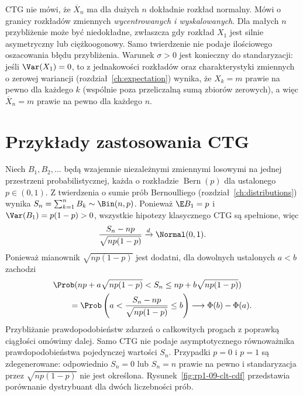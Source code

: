\begin{uwaga}
CTG nie mówi, że $\overline X_n$ ma dla dużych $n$
dokładnie rozkład normalny. Mówi o granicy rozkładów
zmiennych \emph{wycentrowanych i wyskalowanych}.
Dla małych $n$ przybliżenie może być niedokładne,
zwłaszcza gdy rozkład $X_1$ jest silnie asymetryczny
lub ciężkoogonowy. Samo twierdzenie nie podaje
ilościowego oszacowania błędu przybliżenia.
Warunek $\sigma>0$ jest konieczny do standaryzacji:
jeśli $\Var(X_1)=0$, to z jednakowości rozkładów
oraz charakterystyki zmiennych o zerowej wariancji
(rozdział~\ref{ch:expectation}) wynika, że $X_k=m$
prawie na pewno dla każdego $k$ (wspólnie poza przeliczalną sumą
zbiorów zerowych), a więc $\overline X_n=m$
prawie na pewno dla każdego $n$.
\end{uwaga}

\section{Przykłady zastosowania CTG}

\begin{przyklad}
Niech $B_1,B_2,\ldots$ będą wzajemnie niezależnymi
zmiennymi losowymi na jednej przestrzeni probabilistycznej,
każda o rozkładzie $\operatorname{Bern}(p)$ dla ustalonego
$p\in(0,1)$. Z twierdzenia o sumie prób Bernoulliego
(rozdział~\ref{ch:distributions}) wynika
$S_n=\sum_{k=1}^nB_k\sim\Bin(n,p)$.
Ponieważ $\E B_1=p$ i $\Var(B_1)=p(1-p)>0$,
wszystkie hipotezy klasycznego CTG są spełnione, więc
\[
\frac{S_n-np}{\sqrt{np(1-p)}}\xrightarrow d\Normal(0,1).
\]
Ponieważ mianownik $\sqrt{np(1-p)}$ jest dodatni,
dla dowolnych ustalonych $a<b$ zachodzi
\[
\begin{aligned}
&\Prob(np+a\sqrt{np(1-p)}<S_n\leq np+b\sqrt{np(1-p)})\\
&\qquad=\Prob\left(a<\frac{S_n-np}{\sqrt{np(1-p)}}\leq b\right)
\longrightarrow\Phi(b)-\Phi(a).
\end{aligned}
\]
Przybliżanie prawdopodobieństw zdarzeń o całkowitych
progach z poprawką ciągłości omówimy dalej.
Samo CTG nie podaje asymptotycznego równoważnika
prawdopodobieństwa pojedynczej wartości $S_n$.
Przypadki $p=0$ i $p=1$ są zdegenerowane: odpowiednio
$S_n=0$ lub $S_n=n$ prawie na pewno i standaryzacja
przez $\sqrt{np(1-p)}$ nie jest określona.
Rysunek~\ref{fig:rp1-09-clt-cdf} przedstawia porównanie dystrybuant dla dwóch liczebności prób.
\end{przyklad}

